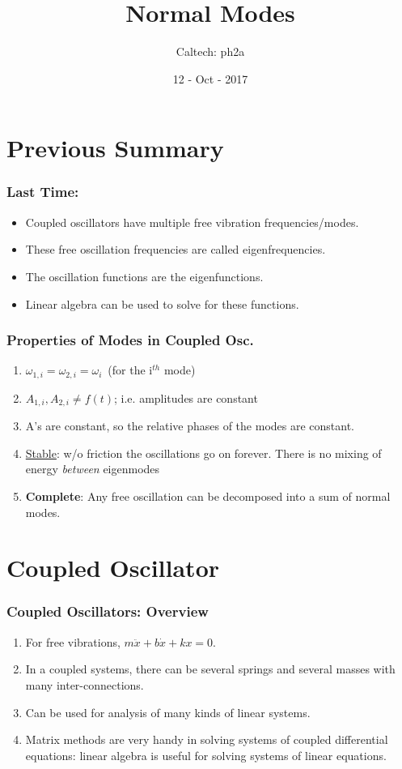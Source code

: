 \documentclass[pdf,handout, hideothersubsections]{beamer}
\begin{document}
\title{Normal Modes}  
\author{Caltech: ph2a}
\date{12 - Oct - 2017}


\frame{\titlepage} 



\section{Previous Summary}
\begin{frame}
\frametitle{Last Time:}
\begin{itemize}
\item Coupled oscillators have multiple free vibration frequencies/modes.
\item These free oscillation frequencies are called eigenfrequencies.
\item The oscillation functions are the eigenfunctions.
\item Linear algebra can be used to solve for these functions.
\end{itemize}
\end{frame}


\begin{frame}
\frametitle{Properties of Modes in Coupled Osc.}
\begin{enumerate}
\pause
\item $\omega_{1,i}=\omega_{2,i}=\omega_i$~(for the i$^{th}$ mode)
\pause
\item $A_{1,i}, A_{2,i} \ne f(t)$; i.e. amplitudes are constant
\pause
\item A's are constant, so the relative phases of the modes are
  constant.
\pause
\item \underline{Stable}: w/o friction the oscillations go on
  forever. There is no mixing of energy \emph{between} eigenmodes
\pause
\item \textbf{Complete}: Any free oscillation can be decomposed into a sum of
  normal modes.

\end{enumerate}
\end{frame}



\section{Coupled Oscillator}
\begin{frame}
\frametitle{Coupled Oscillators: Overview}
\pause
\begin{enumerate}
\item For free vibrations, $m \ddot{x} + b \dot{x} + k x = 0$.
\pause
\item In a coupled systems, there can be several springs and several
  masses with many inter-connections.
\pause
\item Can be used for analysis of many kinds of linear systems.
\pause
\item Matrix methods are very handy in solving systems of coupled
  differential equations: linear algebra is useful for solving systems
  of linear equations.
\end{enumerate}
\end{frame}
\end{document}

